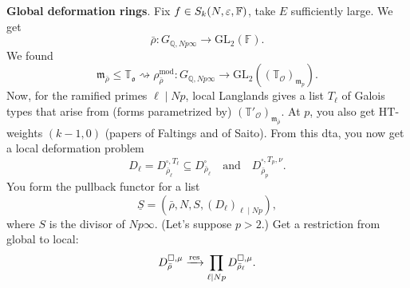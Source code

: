 \documentclass[reqno]{amsart} 
\numberwithin{theorem}{section}
\numberwithin{equation}{section}
\numberwithin{exercise}{section}
\begin{document}
\textbf{Global deformation rings}.  Fix $f \in S_k(N, \varepsilon, \mathbb{F})$, take $E$ sufficiently large.  We get
\begin{equation*}
  \bar{\rho} : G_{\mathbb{Q}, N p \infty} \rightarrow \mathrm{GL}_2(\mathbb{F}).
\end{equation*}
We found
\begin{equation*}
  \mathfrak{m}_{\bar{\rho}} \leq \mathbb{T}_{\mathfrak{o}} \rightsquigarrow \rho_{\bar{\rho}}^{\mathrm{mod}} : G_{\mathbb{Q}, N p \infty}
  \rightarrow \mathrm{GL}_2 \left((\mathbb{T}_{\mathcal{O}})_{\mathfrak{m}_p} \right).
\end{equation*}
Now, for the ramified primes $\ell \mid N p$, local Langlands gives a list $T_{\ell}$ of Galois types that arise from (forms parametrized by) $(\mathbb{T}'_{\mathcal{O}})_{\mathfrak{m}_{\bar{\rho}}}$.  At $p$, you also get $\mathrm{H T}$-weights $(k - 1, 0)$ (papers of Faltings and of Saito).  From this dta, you now get a local deformation problem
\begin{equation*}
  D_{\ell} = D_{\bar{\rho}_{\ell}}^{\square, T_{\ell}} \subseteq D_{\bar{\rho}_{\ell}}^{\square}
  \quad \text{and} \quad
  D_{\bar{\rho}_p}^{\square, T_p, \nu}.
\end{equation*}
You form the pullback functor for a list
\begin{equation*}
  \underline{S} =(\bar{\rho}, N, S,(D_{\ell})_{\ell \mid N p}),
\end{equation*}
where $S$ is the divisor of $N p \infty$. (Let's suppose $p > 2$.)  Get a restriction from global to local:
\begin{equation*}
  D_{\bar{\rho}}^{\square, \mu}
  \xrightarrow{\operatorname{res}}
  \prod_{\ell \mid N p}
  D_{\bar{\rho}_{\ell}}^{\square, \mu}.
\end{equation*}
\end{document}
